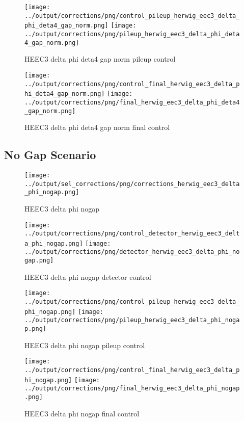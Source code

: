 \documentclass[11pt]{book}
\begin{document}
\begin{figure}[ht]
\centering
\texttt{[image: ../output/corrections/png/control\_pileup\_herwig\_eec3\_delta\_phi\_deta4\_gap\_norm.png]}
\texttt{[image: ../output/corrections/png/pileup\_herwig\_eec3\_delta\_phi\_deta4\_gap\_norm.png]}
\caption{HEEC3 delta phi deta4 gap norm pileup control}
\label{fig:HEEC3_delta_phi_deta4_gap_norm_pileup_control}
\end{figure}


\begin{figure}[ht]
\centering
\texttt{[image: ../output/corrections/png/control\_final\_herwig\_eec3\_delta\_phi\_deta4\_gap\_norm.png]}
\texttt{[image: ../output/corrections/png/final\_herwig\_eec3\_delta\_phi\_deta4\_gap\_norm.png]}
\caption{HEEC3 delta phi deta4 gap norm final control}
\label{fig:HEEC3_delta_phi_deta4_gap_norm_final_control}
\end{figure}


\clearpage
\subsection{No Gap Scenario}
\begin{figure}[ht]
\centering
\texttt{[image: ../output/sel\_corrections/png/corrections\_herwig\_eec3\_delta\_phi\_nogap.png]}
\caption{HEEC3 delta phi nogap}
\label{fig:HEEC3_delta_phi_nogap}
\end{figure}

\begin{figure}[ht]
\centering
\texttt{[image: ../output/corrections/png/control\_detector\_herwig\_eec3\_delta\_phi\_nogap.png]}
\texttt{[image: ../output/corrections/png/detector\_herwig\_eec3\_delta\_phi\_nogap.png]}
\caption{HEEC3 delta phi nogap detector control}
\label{fig:HEEC3_delta_phi_nogap_detector_control}
\end{figure}

\begin{figure}[ht]
\centering
\texttt{[image: ../output/corrections/png/control\_pileup\_herwig\_eec3\_delta\_phi\_nogap.png]}
\texttt{[image: ../output/corrections/png/pileup\_herwig\_eec3\_delta\_phi\_nogap.png]}
\caption{HEEC3 delta phi nogap pileup control}
\label{fig:HEEC3_delta_phi_nogap_pileup_control}
\end{figure}


\begin{figure}[ht]
\centering
\texttt{[image: ../output/corrections/png/control\_final\_herwig\_eec3\_delta\_phi\_nogap.png]}
\texttt{[image: ../output/corrections/png/final\_herwig\_eec3\_delta\_phi\_nogap.png]}
\caption{HEEC3 delta phi nogap final control}
\label{fig:HEEC3_delta_phi_nogap_final_control}
\end{figure}
\end{document}
